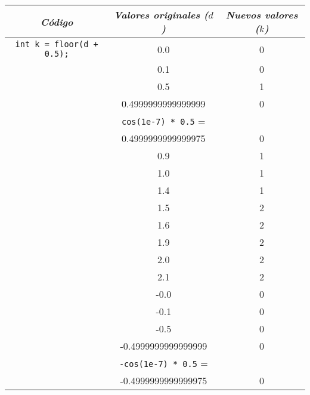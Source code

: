 \documentclass[10pt,letterpaper,twocolumn]{article}
\begin{document}
\begin{center}
  \renewcommand{\arraystretch}{1.3} %
  \begin{tabular}{| c | c | c | }
    \hline
    \textit{Código} & \textit{Valores originales ($d$)} & \textit{Nuevos valores ($k$)} \\
    \hline\hline

    \verb_int k = floor(d + 0.5);_       & 0.0  & 0 \\ \cline{2-3}
                                         & 0.1  & 0 \\ \cline{2-3}
                                         & 0.5  & 1 \\ \cline{2-3}
                                         & 0.4999999999999999 & 0 \\ \cline{2-3}
                                         & \verb_cos(1e-7) * 0.5_ =  & \\ & 0.4999999999999975 & 0 \\ \cline{2-3}
                                         & 0.9  & 1 \\ \cline{2-3}
                                         & 1.0 & 1 \\ \cline{2-3}
                                         & 1.4 & 1 \\ \cline{2-3}
                                         & 1.5 & 2 \\ \cline{2-3}
                                         & 1.6 & 2 \\ \cline{2-3}
                                         & 1.9 & 2 \\ \cline{2-3}
                                         & 2.0 & 2 \\ \cline{2-3}
                                         & 2.1 & 2 \\ \cline{2-3}
                                         & -0.0  & 0 \\ \cline{2-3}
                                         & -0.1  & 0 \\ \cline{2-3}
                                         & -0.5  & 0 \\ \cline{2-3}
                                         & -0.4999999999999999 & 0 \\ \cline{2-3}
                                         & \verb_-cos(1e-7) * 0.5_ =  & \\ & -0.4999999999999975 & 0 \\ \cline{2-3}

\end{tabular}
\end{center}
\end{document}

